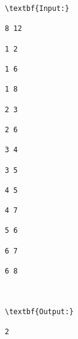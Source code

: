 \begin{verbatim}
\textbf{Input:}

8 12

1 2

1 6

1 8

2 3

2 6

3 4

3 5

4 5

4 7

5 6

6 7

6 8



\textbf{Output:}

2

\end{verbatim}